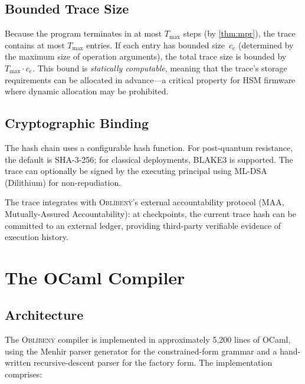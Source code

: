 \documentclass[11pt,a4paper]{article}
\newcommand{\obl}{\textsc{Obl\'{i}ben\'{y}}}
\begin{document}
\subsection{Bounded Trace Size}

Because the program terminates in at most $T_{\max}$ steps (by
\cref{thm:mpr}), the trace contains at most $T_{\max}$ entries.  If each
entry has bounded size~$c_e$ (determined by the maximum size of operation
arguments), the total trace size is bounded by $T_{\max} \cdot c_e$.  This
bound is \emph{statically computable}, meaning that the trace's storage
requirements can be allocated in advance---a critical property for HSM
firmware where dynamic allocation may be prohibited.

\subsection{Cryptographic Binding}

The hash chain uses a configurable hash function.  For post-quantum
resistance, the default is SHA-3-256; for classical deployments, BLAKE3 is
supported.  The trace can optionally be signed by the executing principal
using ML-DSA (Dilithium) for non-repudiation.

The trace integrates with \obl{}'s external accountability protocol (MAA,
Mutually-Assured Accountability): at checkpoints, the current trace hash
can be committed to an external ledger, providing third-party verifiable
evidence of execution history.


\section{The OCaml Compiler}
\label{sec:implementation}

\subsection{Architecture}

The \obl{} compiler is implemented in approximately 5,200 lines of OCaml,
using the Menhir parser generator for the constrained-form grammar and a
hand-written recursive-descent parser for the factory form.  The
implementation comprises:
\end{document}
